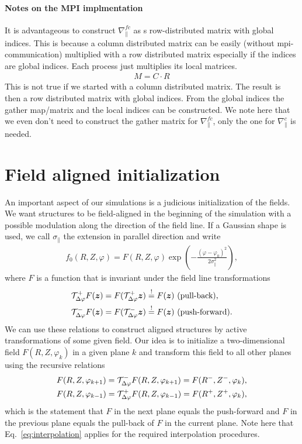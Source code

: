\paragraph{Notes on the MPI implmentation}
It is advantageous to construct $\nabla_\parallel^{fc}$
as s row-distributed matrix with global indices.
This is because a column distributed matrix can be easily (without mpi-communication) multiplied
with a row distributed matrix especially if the indices are global indices.
Each process just multiplies its local matrices.
\begin{align}
M = C\cdot R
\end{align}
This is not true if we started with a column distributed matrix.
The result is then a row distributed matrix with global indices.
From the global indices the gather map/matrix and the local
indices can be constructed.
We note here that we even don't need to construct the gather matrix
for $\nabla_\parallel^{fc}$, only the one for $\nabla_\parallel^c$ is
needed.
\section{Field aligned initialization} \label{sec:parallelc}

An important aspect of our simulations is a judicious initialization of the
fields. We want structures to be field-aligned in the beginning of the simulation with
a possible modulation along the direction of the field line.
If a Gaussian shape is used, we call $\sigma_\parallel$ the extension in parallel
direction and write
\begin{align}
    f_0(R,Z,\varphi) = F(R,Z,\varphi) \exp\left( - \frac{(\varphi-\varphi_0)^2}{2\sigma_\parallel^2}\right),
    \label{eq:parallelInit}
\end{align}
where $F$ is a function that is invariant under the field line transformations
\begin{subequations}
\begin{align}
    \mathcal T^+_{\Delta\varphi} F({\boldsymbol{z}}) &= F( \mathcal T^+_{\Delta\varphi} {\boldsymbol{z}}) \overset{!}{=} F({\boldsymbol{z}}) \text{ (pull-back),} \\
    \mathcal T^-_{\Delta\varphi} F({\boldsymbol{z}}) &= F( \mathcal T^-_{\Delta\varphi} {\boldsymbol{z}}) \overset{!}{=} F({\boldsymbol{z}}) \text{ (push-forward).}
\end{align}
\label{}
\end{subequations}
We can use these relations to construct aligned structures
by active transformations of some given field.
Our idea is to initialize a two-dimensional field $F(R,Z, \varphi_k)$ in a given plane $k$ and
transform this field to all other planes using the recursive relations
\begin{subequations}
\begin{align}
    F( R, Z, \varphi_{k+1}) = \mathcal T^-_{\Delta\varphi} F( R, Z, \varphi_{k+1}) = F(R^-, Z^-, \varphi_k),\\
    F( R, Z, \varphi_{k-1}) = \mathcal T^+_{\Delta\varphi} F( R, Z, \varphi_{k-1}) = F(R^+, Z^+, \varphi_k),
\end{align}
    \label{eq:recursiveInit}
\end{subequations}
which is the statement that $F$ in the next plane equals the push-forward
and $F$ in the previous plane equals the pull-back of $F$ in the current plane.
Note here that Eq.~\eqref{eq:interpolation} applies for the required interpolation
procedures.


